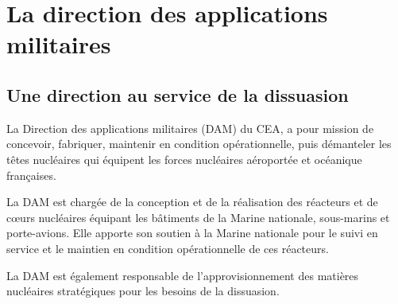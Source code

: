 \documentclass[12pt,a4paper,twoside]{article}
\begin{document}
    \begin{figure}[b]
        \centering
    \end{figure}

    \newpage

    \section*{La direction des applications militaires}

    \subsection*{Une direction au service de la dissuasion}
    La Direction des applications militaires (DAM) du CEA, a pour mission
    de concevoir, fabriquer, maintenir en condition opérationnelle, puis démanteler
    les têtes nucléaires qui équipent les forces nucléaires aéroportée et océanique
    françaises.

    La DAM est chargée de la conception et de la réalisation des réacteurs et de
    c\oe urs nucléaires équipant les bâtiments de la Marine nationale, sous-marins
    et porte-avions. Elle apporte son soutien à la Marine nationale pour le suivi en
    service et le maintien en condition opérationnelle de ces réacteurs.

    La DAM est également responsable de l'approvisionnement des matières nucléaires
    straté\-giques pour les besoins de la dissuasion.
\end{document}
